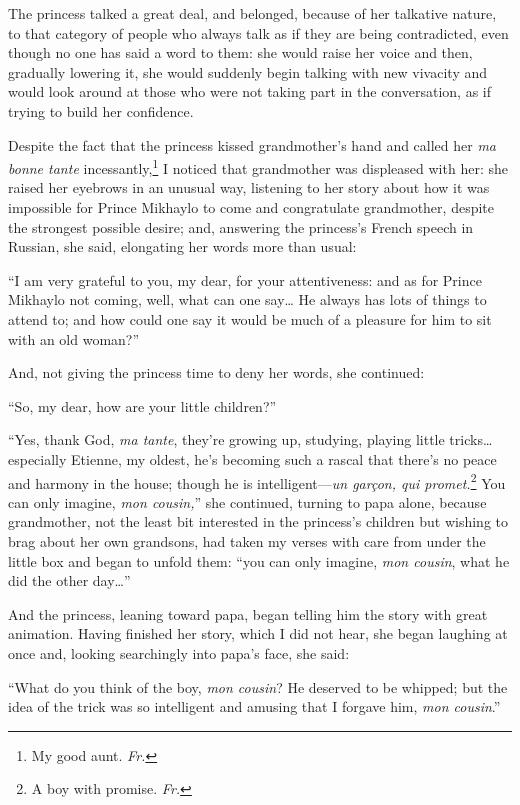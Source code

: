 The princess talked a great deal, and belonged, because of her talkative nature, to that category of people who always talk as if they are being contradicted, even though no one has said a word to them: she would raise her voice and then, gradually lowering it, she would suddenly begin talking with new vivacity and would look around at those who were not taking part in the conversation, as if trying to build her confidence.

Despite the fact that the princess kissed grandmother's hand and called her \textit{ma bonne tante} incessantly,\footnote{My good aunt. \textit{Fr.}} I noticed that grandmother was displeased with her: she raised her eyebrows in an unusual way, listening to her story about how it was impossible for Prince Mikhaylo to come and congratulate grandmother, despite the strongest possible desire; and, answering the princess's French speech in Russian, she said, elongating her words more than usual:

``I am very grateful to you, my dear, for your attentiveness: and as for Prince Mikhaylo not coming, well, what can one say\ldots{} He always has lots of things to attend to; and how could one say it would be much of a pleasure for him to sit with an old woman?'' %

And, not giving the princess time to deny her words, she continued:

``So, my dear, how are your little children?'' %

``Yes, thank God, \textit{ma tante}, they're growing up, studying, playing little tricks\ldots{}especially Etienne, my oldest, he's becoming such a rascal that there's no peace and harmony in the house; though he is intelligent---\textit{un gar\c con, qui promet.}\footnote{A boy with promise. \textit{Fr.}} You can only imagine, \textit{mon cousin,}'' she continued, turning to papa alone, because grandmother, not the least bit interested in the princess's children but wishing to brag about her own grandsons, had taken my verses with care from under the little box and began to unfold them: ``you can only imagine, \textit{mon cousin}, what he did the other day\ldots{}'' %

And the princess, leaning toward papa, began telling him the story with great animation. Having finished her story, which I did not hear, she began laughing at once and, looking searchingly into papa's face, she said:

``What do you think of the boy, \textit{mon cousin}? He deserved to be whipped; but the idea of the trick was so intelligent and amusing that I forgave him, \textit{mon cousin}.'' %

